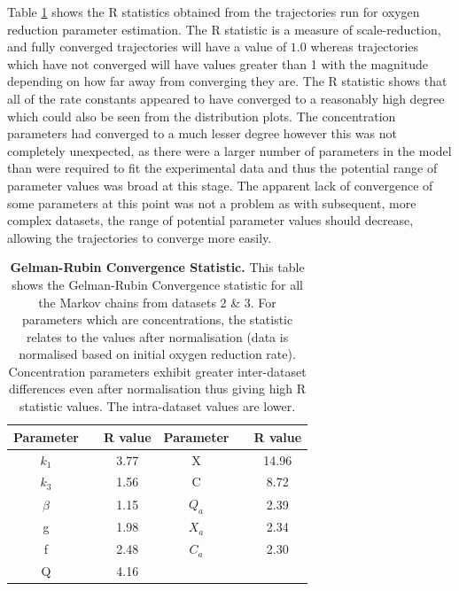 Table \ref{tab:oxyRstat} shows the R statistics obtained from the trajectories run for oxygen reduction parameter estimation. The R statistic is a measure of scale-reduction, and fully converged trajectories will have a value of $1.0$ whereas trajectories which have not converged will have values greater than 1 with the magnitude depending on how far away from converging they are. The R statistic shows that all of the rate constants appeared to have converged to a reasonably high degree which could also be seen from the distribution plots. The concentration parameters had converged to a much lesser degree however this was not completely unexpected, as there were a larger number of parameters in the model than were required to fit the experimental data and thus the potential range of parameter values was broad at this stage. The apparent lack of convergence of some parameters at this point was not a problem as with subsequent, more complex datasets, the range of potential parameter values should decrease, allowing the trajectories to converge more easily.
\begin{table}[tbp]%
\renewcommand{\arraystretch}{1.5}
\begin{center}
\begin{tabular}{ccc|ccc}
\toprule
\textbf{Parameter} && \textbf{R value} & \textbf{Parameter} && \textbf{R value}\\
\midrule
$k_1$ && 3.77 & X && 14.96\\
$k_3$ && 1.56 & C && 8.72\\
$\beta$ && 1.15 & $Q_a$ && 2.39\\
g && 1.98 & $X_a$ && 2.34\\
f && 2.48 & $C_a$ && 2.30\\
Q && 4.16\\
\bottomrule
\end{tabular}
\end{center}
\caption[Gelman-Rubin Convergence Statistic]{{\bf Gelman-Rubin Convergence Statistic.} This table shows the Gelman-Rubin Convergence statistic for all the Markov chains from datasets 2 \& 3. For parameters which are concentrations, the statistic relates to the values after normalisation (data is normalised based on initial oxygen reduction rate). Concentration parameters exhibit greater inter-dataset differences even after normalisation thus giving high R statistic values. The intra-dataset values are lower.
\label{tab:oxyRstat}}
\end{table}

